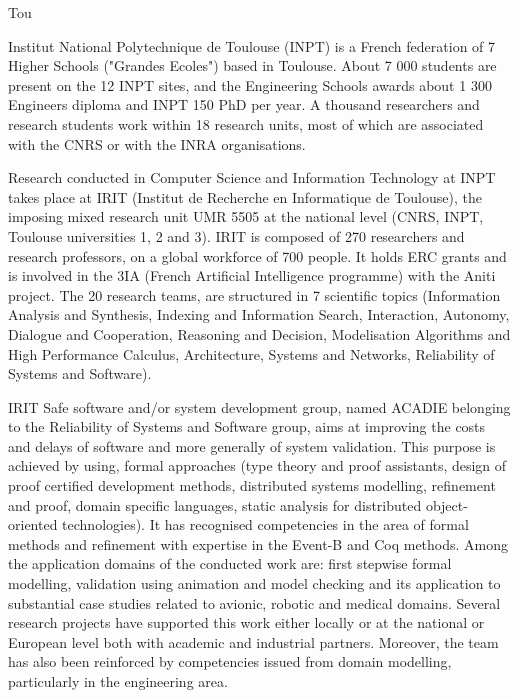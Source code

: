 \begin{sitedescription}{Tou}


Institut National Polytechnique de Toulouse (INPT) is a French federation of 7 Higher Schools ("Grandes Ecoles") based in Toulouse. About 7 000 students are present on the 12 INPT sites, and the Engineering Schools awards about 1 300 Engineers diploma and INPT 150 PhD per year. A thousand researchers and research students work within 18 research units, most of which are associated with the CNRS or with the INRA organisations.

Research conducted in Computer Science and Information Technology 
at INPT takes place at IRIT (Institut de Recherche en Informatique de Toulouse), the imposing mixed research unit UMR 5505 at the national level (CNRS, INPT, Toulouse universities 1, 2 and 3). IRIT is composed of 270 researchers and research professors, on a global workforce of 700 people. It holds ERC grants and is involved in the 3IA (French Artificial Intelligence programme) with the Aniti project. 
The 20 research teams, are structured in 7 scientific topics (Information Analysis and Synthesis, Indexing and Information Search, Interaction, Autonomy, Dialogue and Cooperation, Reasoning and Decision, Modelisation  Algorithms and High Performance Calculus,  Architecture, Systems and Networks, Reliability of Systems and Software). 


 IRIT Safe software and/or system development group, named ACADIE belonging to the Reliability of Systems and Software group,  aims at improving the costs and delays of software and more generally of system validation. This purpose is achieved by using,  formal approaches (type theory and proof assistants, design of proof certified development methods, distributed systems  modelling, refinement  and proof, domain specific languages, static analysis for distributed object-oriented technologies). It has recognised competencies in the area of formal methods and refinement with expertise in the Event-B and Coq methods. Among the application domains of the conducted work are: first stepwise formal modelling, validation using animation and model checking and its application to substantial case studies related to avionic, robotic and medical domains. Several research projects have supported this work either locally or at the national or European level both with academic and industrial partners. Moreover, the team has also been reinforced by competencies issued from domain modelling, particularly in the engineering area.  
 

\end{sitedescription}
